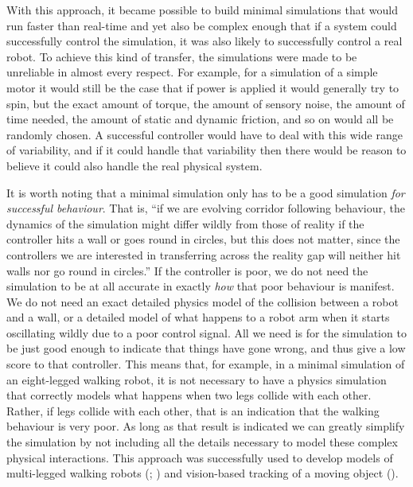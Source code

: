 \documentclass{frontiersSCNS} %
\begin{document}
With this approach, it became possible to build minimal simulations that would
run faster than real-time and yet also be complex enough that if a system
could successfully control the simulation, it was also likely to successfully
control a real robot.  To achieve this kind of transfer, the simulations were made to be
unreliable in almost every respect.  For example, for a simulation of a simple
motor it would still be the case that if power is applied it would generally
try to spin, but the exact amount of torque, the amount of sensory noise,
the amount of time needed, the amount of static and dynamic friction, and so
on would all be randomly chosen.  A successful controller would have to deal
with this wide range of variability, and if it could handle that variability
then there would be reason to believe it could also handle the real physical system.

It is worth noting that a minimal simulation only has to be a
good simulation \emph{for successful behaviour}.  That is, ``if we are evolving 
corridor following behaviour, the dynamics of the simulation might
differ wildly from those of reality if the controller hits a wall or
goes round in circles, but this does
not matter, since the controllers we are interested in transferring
across the reality gap will neither
hit walls nor go round in circles.''  \citep[p.~41]{jakobiThesis}  If the controller is poor, we do not 
need the simulation to be at all accurate in exactly \emph{how} that poor
behaviour is manifest.  We do not need an exact detailed physics model of
the collision between a robot and a wall, or a detailed model of what happens
to a robot arm when it starts oscillating wildly due to a poor control signal.
All we need is for the simulation to be just good enough to indicate that
things have gone wrong, and thus give a low score to that controller.  This
means that, for example, in a minimal simulation of an eight-legged walking robot,
it is not necessary to have a physics simulation that correctly models what
happens when two legs collide with each other.  Rather, if legs collide
with each other, that is an indication that the walking behaviour is very poor.
As long as that result is indicated we can greatly simplify the simulation
by not including all the details necessary to model these complex physical
interactions.  This approach was successfully used to develop models of
multi-legged walking robots (\citealt{jakobiThesis}; \citealt{Meyer2003})
and vision-based tracking of a moving object (\citealt{Nolfi2000}).
\end{document}
